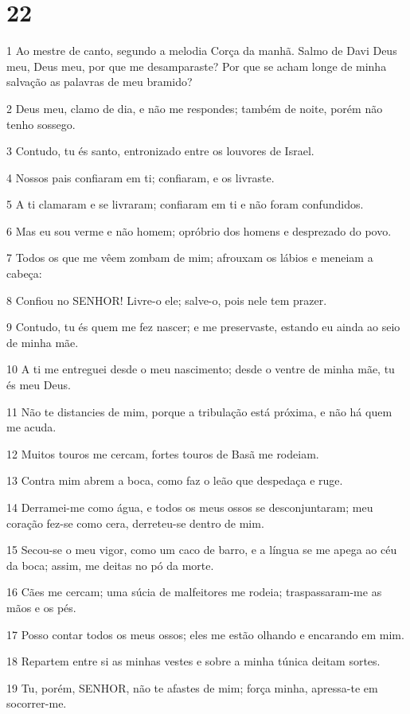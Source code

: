 \chapter{22}

\par 1 Ao mestre de canto, segundo a melodia Corça da manhã. Salmo de Davi Deus meu, Deus meu, por que me desamparaste? Por que se acham longe de minha salvação as palavras de meu bramido?
\par 2 Deus meu, clamo de dia, e não me respondes; também de noite, porém não tenho sossego.
\par 3 Contudo, tu és santo, entronizado entre os louvores de Israel.
\par 4 Nossos pais confiaram em ti; confiaram, e os livraste.
\par 5 A ti clamaram e se livraram; confiaram em ti e não foram confundidos.
\par 6 Mas eu sou verme e não homem; opróbrio dos homens e desprezado do povo.
\par 7 Todos os que me vêem zombam de mim; afrouxam os lábios e meneiam a cabeça:
\par 8 Confiou no SENHOR! Livre-o ele; salve-o, pois nele tem prazer.
\par 9 Contudo, tu és quem me fez nascer; e me preservaste, estando eu ainda ao seio de minha mãe.
\par 10 A ti me entreguei desde o meu nascimento; desde o ventre de minha mãe, tu és meu Deus.
\par 11 Não te distancies de mim, porque a tribulação está próxima, e não há quem me acuda.
\par 12 Muitos touros me cercam, fortes touros de Basã me rodeiam.
\par 13 Contra mim abrem a boca, como faz o leão que despedaça e ruge.
\par 14 Derramei-me como água, e todos os meus ossos se desconjuntaram; meu coração fez-se como cera, derreteu-se dentro de mim.
\par 15 Secou-se o meu vigor, como um caco de barro, e a língua se me apega ao céu da boca; assim, me deitas no pó da morte.
\par 16 Cães me cercam; uma súcia de malfeitores me rodeia; traspassaram-me as mãos e os pés.
\par 17 Posso contar todos os meus ossos; eles me estão olhando e encarando em mim.
\par 18 Repartem entre si as minhas vestes e sobre a minha túnica deitam sortes.
\par 19 Tu, porém, SENHOR, não te afastes de mim; força minha, apressa-te em socorrer-me.
